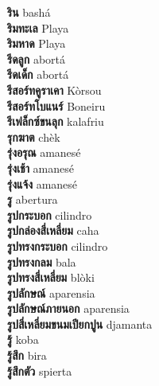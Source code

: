 \textbf{ ริน  } bashá \\
\textbf{ ริมทะเล  } Playa \\
\textbf{ ริมหาด  } Playa \\
\textbf{ รีดลูก  } abortá \\
\textbf{ รีดเด็ก  } abortá \\
\textbf{ รีสอร์ทคูราเคา  } Kòrsou \\
\textbf{ รีสอร์ทโบแนร์  } Boneiru \\
\textbf{ รีเฟล็กซ์ขนลุก  } kalafriu \\
\textbf{ รุกฆาต  } chèk \\
\textbf{ รุ่งอรุณ  } amanesé \\
\textbf{ รุ่งเช้า  } amanesé \\
\textbf{ รุ่งแจ้ง  } amanesé \\
\textbf{ รู  } abertura \\
\textbf{ รูปกระบอก  } cilindro \\
\textbf{ รูปกล่องสี่เหลี่ยม  } caha \\
\textbf{ รูปทรงกระบอก  } cilindro \\
\textbf{ รูปทรงกลม  } bala \\
\textbf{ รูปทรงสี่เหลี่ยม  } blòki \\
\textbf{ รูปลักษณ์  } aparensia \\
\textbf{ รูปลักษณ์ภายนอก  } aparensia \\
\textbf{ รูปสี่เหลี่ยมขนมเปียกปูน  } djamanta \\
\textbf{ รู้  } koba \\
\textbf{ รู้สึก  } bira \\
\textbf{ รู้สึกตัว  } spierta \\
